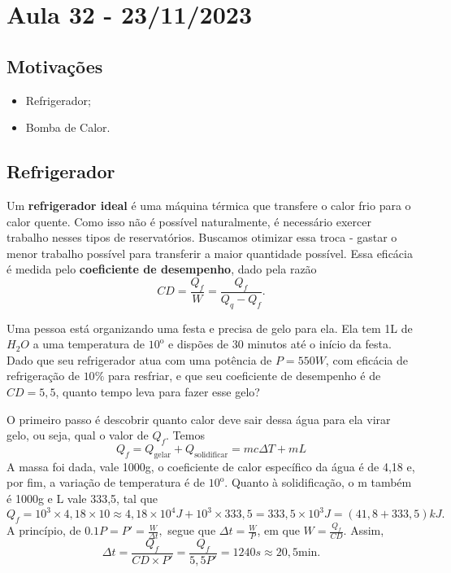 \documentclass[PhysicsII/phsyicsII_notes.tex]{subfiles}
\begin{document}
\section{Aula 32 - 23/11/2023}
\subsection{Motivações}
\begin{itemize}
	\item Refrigerador;
	\item Bomba de Calor.
\end{itemize}
\subsection{Refrigerador}
Um \textbf{refrigerador ideal} é uma máquina térmica que transfere o calor frio para o calor quente. Como isso não é possível
naturalmente, é necessário exercer trabalho nesses tipos de reservatórios. Buscamos otimizar essa troca - gastar o menor
trabalho possível para transferir a maior quantidade possível. Essa eficácia é medida pelo \textbf{coeficiente de desempenho},
dado pela razão
\[
	\boxed{CD = \frac{Q_{f}}{W} = \frac{Q_{f}}{Q_{q}-Q_{f}}}.
\]
\begin{example}
	Uma pessoa está organizando uma festa e precisa de gelo para ela. Ela tem 1L de \(H_{2}O\) a uma temperatura de \({10}^{\mathrm{o}}\) e dispões de 30 minutos até
	o início da festa. Dado que seu refrigerador atua com uma potência de \(P=550W\), com eficácia de refrigeração de \(10\%\) para resfriar,
	e que seu coeficiente de desempenho é de \(CD=5,5\), quanto tempo leva para fazer esse gelo?

	O primeiro passo é descobrir quanto calor deve sair dessa água para ela virar gelo, ou seja, qual o valor de \(Q_{f}\). Temos
	\[
		Q_{f} = Q_{\text{gelar}} + Q_{\text{solidificar}} = mc\Delta T + mL
	\]
	A massa foi dada, vale 1000g, o coeficiente de calor específico da água é de 4,18 e, por fim, a variação de temperatura é de \({10}^{\mathrm{o}}\).
	Quanto à solidificação, o m também é 1000g e L vale 333,5, tal que
	\[
		Q_{f} = 10^{3}\times4,18\times 10\approx 4,18\times10^{4}J + 10^{3}\times 333,5 = 333,5\times 10^{3}J = (41,8+333,5)kJ.
	\]
	A princípio, de \(0.1P = P' = \frac{W}{\Delta t},\) segue que \(\Delta t = \frac{W}{P}\), em que \(W = \frac{Q_{f}}{CD}\). Assim,
	\[
		\Delta t = \frac{Q_{f}}{CD\times P'} = \frac{Q_{f}}{5,5P'} = 1240s\approx 20,5 \text{min.}
	\]
\end{example}
\end{document}
